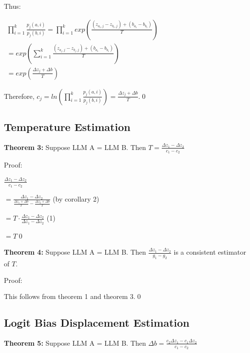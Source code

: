 \documentclass{article}
\begin{document}
Thus:

$\displaystyle  \begin{array}{l}
\prod _{i=1}^{k}\frac{p_{j}\left( a,i\right)}{p_{j}\left( b,i\right)} =\prod _{i=1}^{k} exp\left(\frac{\left( z_{a_{i} ,j} -z_{b_{i} ,j}\right) +\left( b_{a_{i}} -b_{b_{i}}\right)}{T}\right)\\
=exp\left(\sum _{i=1}^{k}\frac{\left( z_{a_{i} ,j} -z_{b_{i} ,j}\right) +\left( b_{a_{i}} -b_{b_{i}}\right)}{T}\right)\\
=exp\left(\frac{\Delta z_{j} +\Delta b}{T}\right)
\end{array}$

Therefore, $\displaystyle c_{j} =ln\left(\prod _{i=1}^{k}\frac{p_{j}\left( a,i\right)}{p_{j}\left( b,i\right)}\right) =\frac{\Delta z_{j} +\Delta b}{T}$.\qed 



\subsection{Temperature Estimation}

\textbf{Theorem 3:} Suppose LLM A = LLM B. Then $\displaystyle T=\frac{\Delta z_{1} -\Delta z_{2}}{c_{1} -c_{2}}$

Proof:

$\displaystyle \frac{\Delta z_{1} -\Delta z_{2}}{c_{1} -c_{2}}$

$\displaystyle =\frac{\Delta z_{1} -\Delta z_{2}}{\frac{\Delta z_{1} +\Delta b}{T} -\frac{\Delta z_{2} +\Delta b}{T}}$ (by corollary 2)

$\displaystyle =T\cdot \frac{\Delta z_{1} -\Delta z_{2}}{\Delta z_{1} -\Delta z_{2}}$ (1)

$\displaystyle =T$\qed 





\textbf{Theorem 4:} Suppose LLM A = LLM B. Then $\displaystyle \frac{\Delta z_{1} -\Delta z_{2}}{g_{1} -g_{2}}$ is a consistent estimator of $\displaystyle T$.

Proof:

This follows from theorem 1 and theorem 3.\qed 





\subsection{Logit Bias Displacement Estimation}

\textbf{Theorem 5:} Suppose LLM A = LLM B. Then $\displaystyle \Delta b=\frac{c_{2} \Delta z_{1} -c_{1} \Delta z_{2}}{c_{1} -c_{2}}$
\end{document}
